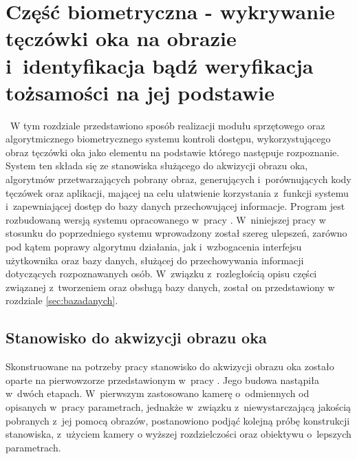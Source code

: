 \chapter{Część biometryczna - wykrywanie tęczówki oka na obrazie i~identyfikacja bądź weryfikacja tożsamości na jej podstawie}
\label{cha:realizacja}
~W tym rozdziale przedstawiono sposób realizacji modułu sprzętowego oraz algorytmicznego biometrycznego systemu kontroli dostępu, wykorzystującego obraz tęczówki oka jako elementu na podstawie którego następuje rozpoznanie. System ten składa się ze stanowiska służącego do akwizycji obrazu oka, algorytmów przetwarzających pobrany obraz, generujących i~porównujących kody tęczówek oraz aplikacji, mającej na celu ułatwienie korzystania z~funkcji systemu i~zapewniającej dostęp do bazy danych przechowującej informacje. Program jest rozbudowaną wersją systemu opracowanego w~pracy \cite{Gl11}. W~niniejszej pracy w stosunku do poprzedniego systemu wprowadzony został szereg ulepszeń, zarówno pod kątem poprawy algorytmu działania, jak i~wzbogacenia interfejsu użytkownika oraz bazy danych, służącej do przechowywania informacji dotyczących rozpoznawanych osób. W~związku z~rozległością opisu części związanej z~tworzeniem oraz obsługą bazy danych, został on przedstawiony w rozdziale \ref{sec:bazadanych}.

\section{Stanowisko do akwizycji obrazu oka}
\label{sec:stanowisko}
Skonstruowane na potrzeby pracy stanowisko do akwizycji obrazu oka zostało oparte na pierwowzorze przedstawionym w~pracy \cite{Gl11}. Jego budowa  nastąpiła w~dwóch etapach. W~pierwszym zastosowano kamerę o~odmiennych od opisanych w~pracy \cite{Gl11} parametrach, jednakże w~związku z~niewystarczającą jakością pobranych z~jej pomocą obrazów, postanowiono podjąć kolejną próbę konstrukcji stanowiska, z~użyciem kamery o wyższej rozdzielczości oraz obiektywu o~lepszych parametrach.

